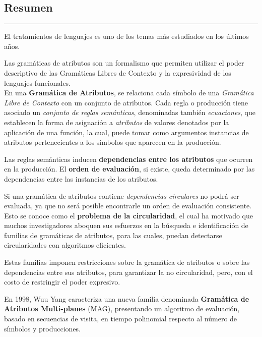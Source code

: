 \documentclass[a4paper,11pt]{ThesisStyle}
\begin{document}
\dominitoc


\begin{vcenterpage}

\section*{Resumen}
\noindent\rule[2pt]{\textwidth}{0.5pt}

El tratamientos de lenguajes es uno de los temas más estudiados en los últimos años.

Las gramáticas de atributos son un formalismo que permiten utilizar el poder descriptivo de las Gramáticas Libres de Contexto y la expresividad de los lenguajes funcionales.\\ 

En una \textbf{Gramática de Atributos}, se relaciona cada símbolo de una \textit{Gramática Libre de Contexto} con un conjunto de atributos. Cada regla o producción tiene asociado un \textit{conjunto de reglas semánticas}, denominadas también \textit{ecuaciones}, que establecen la forma de asignación a \textit{atributos} de valores denotados por la aplicación de una función, la cual, puede tomar como argumentos instancias de atributos pertenecientes a los símbolos que aparecen en la producción.

Las reglas semánticas inducen \textbf{dependencias entre los atributos} que ocurren en la producción. El \textbf{orden de evaluación}, si existe, queda determinado por las dependencias entre las instancias de los atributos.

Si una gramática de atributos contiene \textit{dependencias circulares} no podrá ser evaluada, ya que no será posible encontrarle un orden de evaluación consistente. Esto se conoce como el \textbf{problema de la circularidad}, el cual ha motivado que muchos investigadores aboquen sus esfuerzos en la búsqueda e identificación de familias de gramáticas de atributos, para las cuales, puedan detectarse circularidades con algoritmos eficientes.

Estas familias imponen restricciones sobre la gramática de atributos o sobre las dependencias entre sus atributos, para garantizar la no circularidad, pero, con el costo de restringir el poder expresivo.

En 1998, Wuu Yang caracteriza una nueva familia denominada \textbf{Gramática de Atributos Multi-planes} (MAG), presentando un algoritmo de evaluación, basado en secuencias de visita, en tiempo polinomial respecto al número de símbolos y producciones.\\ 


\end{vcenterpage}
\end{document}
